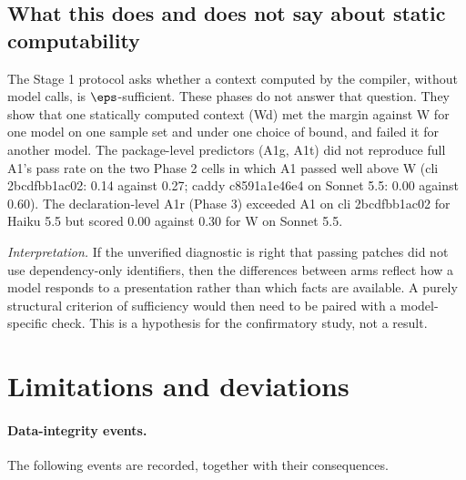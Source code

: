 \subsection{What this does and does not say about static computability}

The Stage 1 protocol asks whether a context computed by the compiler, without model calls, is $\eps$-sufficient. These phases do not answer that question. They show that one statically computed context (Wd) met the margin against W for one model on one sample set and under one choice of bound, and failed it for another model. The package-level predictors (A1g, A1t) did not reproduce full A1's pass rate on the two Phase 2 cells in which A1 passed well above W (cli 2bcdfbb1ac02: 0.14 against 0.27; caddy c8591a1e46e4 on Sonnet 5.5: 0.00 against 0.60). The declaration-level A1r (Phase 3) exceeded A1 on cli 2bcdfbb1ac02 for Haiku 5.5 but scored 0.00 against 0.30 for W on Sonnet 5.5.

\emph{Interpretation.} If the unverified diagnostic is right that passing patches did not use dependency-only identifiers, then the differences between arms reflect how a model responds to a presentation rather than which facts are available. A purely structural criterion of sufficiency would then need to be paired with a model-specific check. This is a hypothesis for the confirmatory study, not a result.

\section{Limitations and deviations}\label{sec:lim}

\paragraph{Data-integrity events.} The following events are recorded, together with their consequences.

